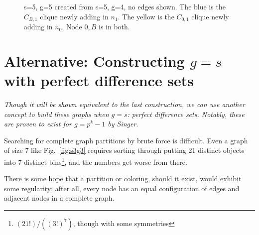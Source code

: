\documentclass[11pt, oneside]{article} 	%
\begin{document}
\begin{figure}[!htb]
\centering
{}
\caption{s=5, g=5 created from s=5, g=4, no edges shown. The blue is the $C_{B,1}$ clique newly adding in $n_1$. The yellow is the $C_{0,1}$ clique newly adding in $n_0$. Node $0,B$ is in both.}
\label{fig:s5g5}
\end{figure}



\section{Alternative: Constructing $g=s$ with perfect difference sets}
\emph{Though it will be shown equivalent to the last construction, we can use another concept to build these graphs when $g=s$: perfect difference sets. Notably, these are proven to exist for $g=p^k-1$ by Singer\cite{1}}.

Searching for complete graph partitions by brute force is difficult. Even a graph of size 7 like Fig.~\ref{fig:s3g3} requires sorting through putting 21 distinct objects into 7 distinct bins\footnote{$(21!)/((3!)^7)$, though with some symmetries}, and the numbers get worse from there. 

There is some hope that a partition or coloring, should it exist, would exhibit some regularity; after all, every node has an equal configuration of edges and adjacent nodes in a complete graph.
\end{document}
